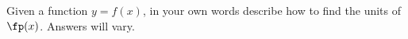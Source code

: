 {Given a function $y=f(x)$, in your own words describe how to find the units of $\fp(x)$.
}
{Answers will vary.
}

